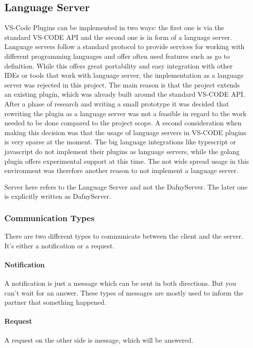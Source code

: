 \subsection{Language Server}

VS-Code Plugins can be implemented in two ways: the first one is via the standard VS-CODE API and the second one is in form of a language server. Language servers follow a standard protocol to provide services for working with different programming languages and offer often used features such as go to definition. While this offers great portability and easy integration with other IDEs or tools that work with language server, the implementation as a language server was rejected in this project. \newline
The main reason is that the project extends an existing plugin, which was already built around the standard VS-CODE API. After a phase of research and writing a small prototype it was decided that rewriting the plugin as a language server was not a feasible in regard to the work needed to be done compared to the project scope. \newline
A second consideration when making this decision was that the usage of language servers in VS-CODE plugins is very sparse at the moment. The big language integrations like typescript or javascript do not implement their plugins as language servers, while the golang plugin offers experimental support at this time. The not wide spread usage in this environment was therefore another reason to not implement a language server.


Server here refers to the Language Server and not the DafnyServer. The later one is explicitly written as DafnyServer.

\subsubsection{Communication Types}
There are two different types to communicate between the client and the server. It's either a notification or a request. 

\paragraph{Notification}
A notification is just a message which can be sent in both directions. But you can't wait for an answer. These types of messages are mostly used to inform the partner that something happened. 

\paragraph{Request}
A request on the other side is message, which will be answered.  

